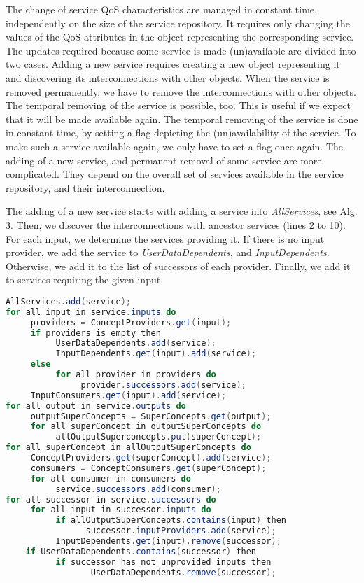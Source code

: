 \documentclass[11pt]{llncs}
\begin{document}

The change of service QoS characteristics are managed in constant time, independently
on the size of the service repository. It requires only changing the values
of the QoS attributes in the object representing the corresponding service. The
updates required because some service is made (un)available are divided into two
cases. Adding a new service requires creating a new object representing it and discovering
its interconnections with other objects. When the service is removed permanently,
we have to remove the interconnections with other objects. The temporal
removing of the service is possible, too. This is useful if we expect that it will be
made available again. The temporal removing of the service is done in constant time,
by setting a flag depicting the (un)availability of the service. To make such a service
available again, we only have to set a flag once again. The adding of a new service,
and permanent removal of some service are more complicated. They depend on the
overall set of services available in the service repository, and their interconnection.

The adding of a new service starts with adding a service into \emph{AllServices}, see
Alg. 3. Then, we discover the interconnections with ancestor services (lines 2 to
10). For each input, we determine the services providing it. If there is no input
provider, we add the service to \emph{UserDataDependents}, and \emph{InputDependents}. Otherwise,
we add it to the list of successors of each provider. Finally, we add it to
services requiring the given input.

\begin{lstlisting}[language=Java,caption={\normalsize Add service: Input: \emph{service}}]
AllServices.add(service);
for all input in service.inputs do
     providers = ConceptProviders.get(input);
     if providers is empty then
          UserDataDependents.add(service);
          InputDependents.get(input).add(service);
     else
          for all provider in providers do
               provider.successors.add(service);
     InputConsumers.get(input).add(service);
for all output in service.outputs do
     outputSuperConcepts = SuperConcepts.get(output);
     for all superConcept in outputSuperConcepts do
          allOutputSuperconcepts.put(superConcept);
for all superConcept in allOutputSuperConcepts do
     ConceptProviders.get(superConcept).add(service);
     consumers = ConceptConsumers.get(superConcept);
     for all consumer in consumers do
          service.successors.add(consumer);
for all successor in service.successors do
     for all input in successor.inputs do
          if allOutputSuperConcepts.contains(input) then
                successor.inputProviders.add(service);
          InputDependents.get(input).remove(successor);
    if UserDataDependents.contains(successor) then
          if successor has not unprovided inputs then
                 UserDataDependents.remove(successor);
\end{lstlisting}
\end{document}
